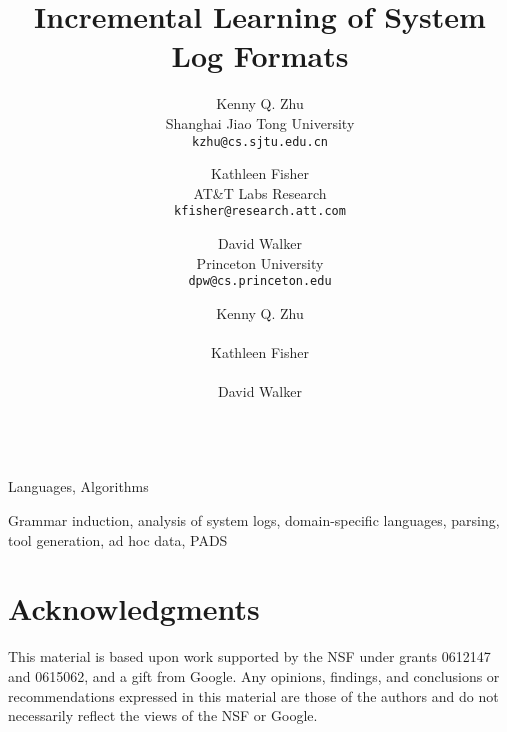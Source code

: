 \documentclass{acm_proc_article-sp}
\author{Kenny Q. Zhu \\
	   Shanghai Jiao Tong University\\
       {\small \tt kzhu@cs.sjtu.edu.cn}
	\and Kathleen Fisher \\
	   AT\&T Labs Research\\
       {\small \tt kfisher@research.att.com}
	\and David Walker \\
	   Princeton University\\
       {\small \tt dpw@cs.princeton.edu}}
\date{}
\begin{document}



\title{Incremental Learning of System Log Formats}

\author{
\alignauthor
  Kenny Q. Zhu \\
   \\
\alignauthor
  Kathleen Fisher \\
   \\
\alignauthor
  David Walker \\
   \\
}

\maketitle




\terms
Languages, Algorithms

\keywords
Grammar induction, analysis of system logs, domain-specific languages, parsing,
tool generation, ad hoc data, PADS












\section*{Acknowledgments}
This material is based upon work
 supported by the NSF under grants 0612147 and 0615062, and
a gift from Google. Any opinions, findings, and conclusions or recommendations
expressed in this material are those of the authors and do not
necessarily reflect the views of the NSF or Google.


%



%
\end{document}
